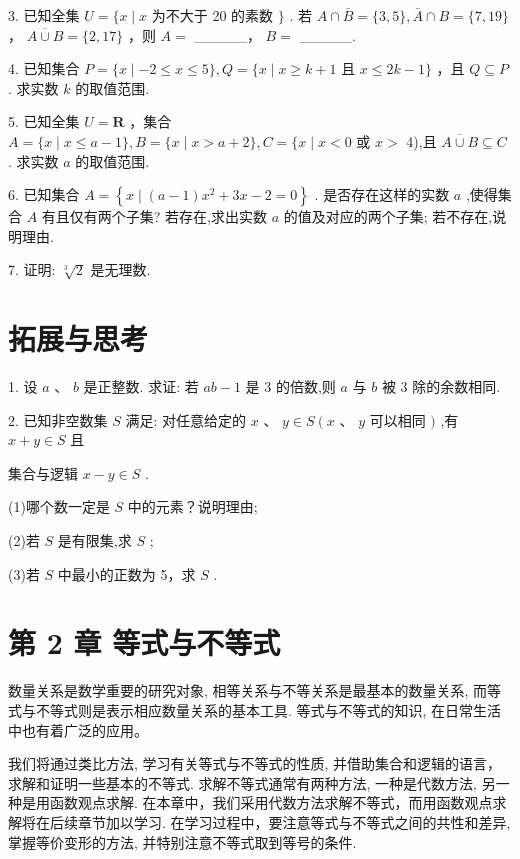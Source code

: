 \documentclass[10pt]{article}
\begin{document}
3. 已知全集 \(U = \{ x \mid  x\) 为不大于 20 的素数 \(\}\) . 若 \(A \cap  \bar{B} = \{ 3,5\} ,\bar{A} \cap  B = \{ 7,{19}\}\) ， \(\overline{A \cup  B} = \{ 2,{17}\}\) ，则 \(A =\) \_\_\_\_\_， \(B =\) \_\_\_\_\_.

4. 已知集合 \(P = \{ x \mid   - 2 \leq  x \leq  5\} ,Q = \{ x \mid  x \geq  k + 1\) 且 \(x \leq  {2k} - 1\}\) ，且 \(Q \subseteq  P\) . 求实数 \(k\) 的取值范围.

5. 已知全集 \(U = \mathbf{R}\) ，集合 \(A = \{ x \mid  x \leq  a - 1\} ,B = \{ x \mid  x > a + 2\} ,C = \{ x \mid  x < 0\) 或 \(x >\) 4),且 \(\overline{A \cup  B} \subseteq  C\) . 求实数 \(a\) 的取值范围.

6. 已知集合 \(A = \left\{  {x \mid  \left( {a - 1}\right) {x}^{2} + {3x} - 2 = 0}\right\}\) . 是否存在这样的实数 \(a\) ,使得集合 \(A\) 有且仅有两个子集? 若存在,求出实数 \(a\) 的值及对应的两个子集; 若不存在,说明理由.

7. 证明: \(\sqrt[3]{2}\) 是无理数.

\section*{拓展与思考}

1. 设 \(a\text{ 、 }b\) 是正整数. 求证: 若 \({ab} - 1\) 是 3 的倍数,则 \(a\) 与 \(b\) 被 3 除的余数相同.

2. 已知非空数集 \(S\) 满足: 对任意给定的 \(x\text{ 、 }y \in  S\left( {x\text{ 、 }y}\right.\) 可以相同 \()\) ,有 \(x + y \in  S\) 且



集合与逻辑 \(x - y \in  S\) .

(1)哪个数一定是 \(S\) 中的元素？说明理由;

(2)若 \(S\) 是有限集,求 \(S\) ;

(3)若 \(S\) 中最小的正数为 5，求 \(S\) .

\section*{第 2 章 等式与不等式}

数量关系是数学重要的研究对象, 相等关系与不等关系是最基本的数量关系, 而等式与不等式则是表示相应数量关系的基本工具. 等式与不等式的知识, 在日常生活中也有着广泛的应用。

我们将通过类比方法, 学习有关等式与不等式的性质, 并借助集合和逻辑的语言，求解和证明一些基本的不等式. 求解不等式通常有两种方法, 一种是代数方法, 另一种是用函数观点求解. 在本章中，我们采用代数方法求解不等式，而用函数观点求解将在后续章节加以学习. 在学习过程中，要注意等式与不等式之间的共性和差异, 掌握等价变形的方法, 并特别注意不等式取到等号的条件.
\end{document}
